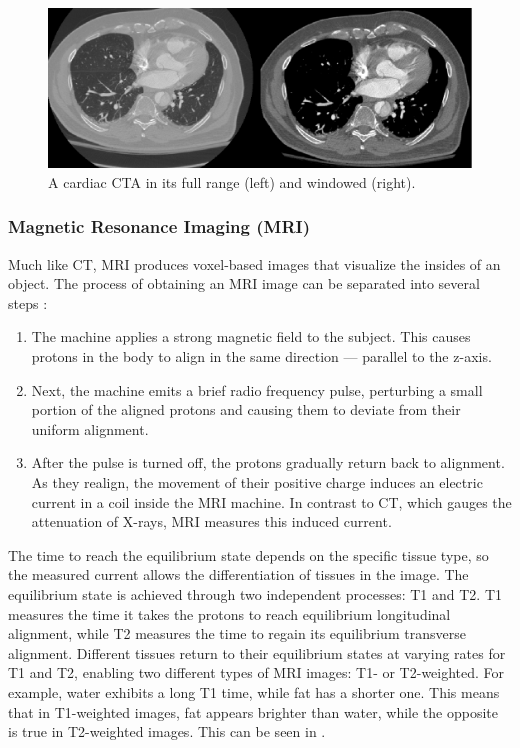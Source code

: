 \begin{figure}[hb]
 \centering
 \includegraphics[width=\linewidth]{images/windowing-example}
 \caption{A cardiac CTA in its full range (left) and windowed (right). \cite{radlAVTMulticenterAortic2022a}}
 \label{fig:windowing-example}
 \end{figure}

\subsubsection{Magnetic Resonance Imaging (MRI)}

Much like CT, MRI produces voxel-based images that visualize the insides of an object. The process of obtaining an MRI image can be separated into several steps \cite{groverMagneticResonanceImaging2015}:

\begin{enumerate}
	\item The machine applies a strong magnetic field to the subject. This causes protons in the body to align in the same direction --- parallel to the z-axis.
	\item Next, the machine emits a brief radio frequency pulse, perturbing a small portion of the aligned protons and causing them to deviate from their uniform alignment.
	\item After the pulse is turned off, the protons gradually return back to alignment. As they realign, the movement of their positive charge induces an electric current in a coil inside the MRI machine. In contrast to CT, which gauges the attenuation of X-rays, MRI measures this induced current.
\end{enumerate}

The time to reach the equilibrium state depends on the specific tissue type, so the measured current allows the differentiation of tissues in the image. The equilibrium state is achieved through two independent processes: T1 and T2. T1 measures the time it takes the protons to reach equilibrium longitudinal alignment, while T2 measures the time to regain its equilibrium transverse alignment. Different tissues return to their equilibrium states at varying rates for T1 and T2, enabling two different types of MRI images: T1- or T2-weighted. For example, water exhibits a long T1 time, while fat has a shorter one. This means that in T1-weighted images, fat appears brighter than water, while the opposite is true in T2-weighted images. This can be seen in .

